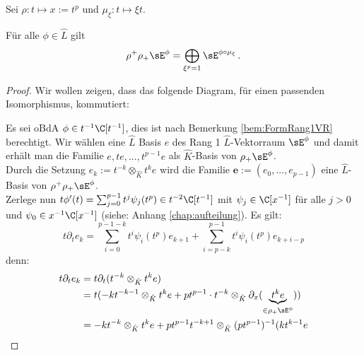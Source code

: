 Sei $\rho:t\mapsto x:=t^p$ und $\mu_\xi:t\mapsto\xi t$.
\begin{lem}
\cite[Lem 2.4]{sabbah_Fourier-local}
Für alle $\phi \in \hat L$ gilt
\[
\rho^+\rho_+\sE^\phi=\bigoplus_{\xi^p=1}\sE^{\phi\circ\mu_\xi} \,.
\]
\end{lem}
%
\begin{proof}
Wir wollen zeigen, dass das folgende Diagram, für einen passenden
Isomorphismus, kommutiert:
\begin{center}
\end{center}
Es sei oBdA $\phi\in t^{-1}\C[t^{-1}]$, dies ist nach Bemerkung 
\ref{bem:FormRang1VR} berechtigt.
Wir wählen eine $\hat L$ Basis $e$ des Rang 1 $\hat L$-Vektorraum $\sE^\phi$
und damit erhält man die Familie $e,te,...,t^{p-1}e$ als $\hat K$-Basis von
$\rho_+\sE^\phi$.\\
Durch die Setzung $e_k:=t^{-k}\otimes_{\hat K}t^ke$ wird die Familie
$\mathbf{e}:=(e_0,...,e_{p-1})$ eine $\hat L$-Basis von
$\rho^+\rho_+\sE^\phi$.\\
Zerlege nun $t\phi'(t)=\sum_{j=0}^{p-1}t^j\psi_j(t^p)\in t^{-2}\C[t^{-1}]$
mit $\psi_j\in\C[x^{-1}]$ für alle $j>0$ und $\psi_0\in x^{-1}\C[x^{-1}]$
(siehe: Anhang \ref{chap:aufteilung}). 
Es gilt:
\[
t\partial_te_k= \sum_{i=0}^{p-1-k}t^i\psi_i(t^p)e_{k+1} +
  \sum_{i=p-k}^{p-1}t^i\psi_i(t^p)e_{k+i-p} 
\]
denn:
\begin{align*}
t\partial_te_k &= t\partial_t(t^{-k}\otimes_{\hat K}t^ke)\\
  &= t(-kt^{-k-1}\otimes_{\hat K}t^ke +
    pt^{p-1}\cdot t^{-k}\otimes_{\hat K}\partial_x
    (\underset{\in\rho_+\sE^\phi}{\underbrace{t^ke}}))\\
  &= -kt^{-k}\otimes_{\hat K}t^ke +
    pt^{p-1}t^{-k+1}\otimes_{\hat K}(pt^{p-1})^{-1} (kt^{k-1}e

\end{align*}
\end{proof}
